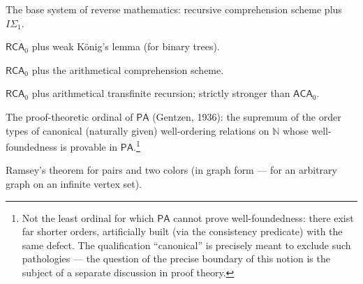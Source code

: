 \documentclass[12pt,a4paper]{article}
\theoremstyle{plain}
\theoremstyle{definition}
\newcommand{\PA}{\textsf{PA}}
\begin{document}
\begin{description}[leftmargin=3.2cm, style=nextline, font=\normalfont]
    \item[$\textsf{RCA}_0$] The base system of reverse mathematics: recursive comprehension scheme plus $I\Sigma_1$.
    \item[$\textsf{WKL}_0$] $\textsf{RCA}_0$ plus weak König's lemma (for binary trees).
    \item[$\textsf{ACA}_0$] $\textsf{RCA}_0$ plus the arithmetical comprehension scheme.
    \item[$\textsf{ATR}_0$] $\textsf{RCA}_0$ plus arithmetical transfinite recursion; strictly stronger than $\textsf{ACA}_0$.
    \item[$\varepsilon_0$] The proof-theoretic ordinal of $\PA$ (Gentzen, 1936): the supremum of the order types of canonical (naturally given) well-ordering relations on $\mathbb N$ whose well-foundedness is provable in $\PA$.\footnote{Not the least ordinal for which $\PA$ cannot prove well-foundedness: there exist far shorter orders, artificially built (via the consistency predicate) with the same defect. The qualification ``canonical'' is precisely meant to exclude such pathologies --- the question of the precise boundary of this notion is the subject of a separate discussion in proof theory.}
    \item[$RT^2_2$] Ramsey's theorem for pairs and two colors (in graph form --- for an arbitrary graph on an infinite vertex set).
\end{description}
\end{document}
